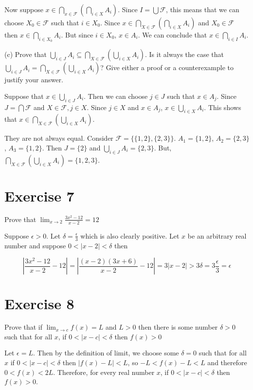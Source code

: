 \documentclass[11pt]{article}
\newcommand{\family}[1]{\mathcal{#1}}
\begin{document}
Now suppose $x \in \bigcap_{x \in \family{F}} (\bigcap_{i \in X} A_i)$.
Since $I = \bigcup \family{F}$, this means that we can choose $X_0 \in \family{F}$
such that $i \in X_0$. Since 
$x \in \bigcap_{X \in \family{F}} (\bigcap_{i \in X} A_i)$ and $X_0 \in \family{F}$
then $x \in \bigcap_{i \in X_0} A_i$. But since $i \in X_0$, $x \in A_i$. We can 
conclude that $x \in \bigcap_{i \in I} A_i$.

\noindent (c) Prove that $\bigcup_{i \in J} A_i \subseteq \bigcap_{X \in \family{F}} (\bigcup_{i \in X} A_i)$.
Is it always the case that $\bigcup_{i \in J} A_i = \bigcap_{X \in \family{F}} (\bigcup_{i \in X} A_i)$?
Give either a proof or a counterexample to justify your answer.

Suppose that $x \in \bigcup_{i \in J} A_i$. Then we can choose $j \in J$ such that 
$x \in A_j$. Since $J = \bigcap \family{F}$ and $X \in \family{F}, j \in X$.
Since $j \in X$ and $x \in A_j$, $x \in \bigcup_{i \in X} A_i$.
This shows that $x \in \bigcap_{X \in \family{F}} (\bigcup_{i \in X} A_i)$.

They are not always equal. Consider $\family{F} = \{\{1,2\},\{2,3\}\}$. 
$A_1 = \{1,2\}$, $A_2 = \{2,3\}$, $A_3 = \{1,2\}$. Then $J = \{2\}$ and 
$\bigcup_{i \in J} A_i = \{2,3\}$. But, 
$\bigcap_{X \in \family{F}} (\bigcup_{i \in X} A_i) = \{1,2,3\}$.

\section*{Exercise 7}

Prove that $\lim_{x \to 2} \frac{3x^2 - 12}{x - 2} = 12$

Suppose $\epsilon > 0$. Let $\delta = \frac{\epsilon}{3}$ which is also clearly 
positive. Let $x$ be an arbitrary real number and suppose 
$0 < | x - 2 | < \delta$ then 

$$\left| \frac{3x^2 - 12}{x - 2} - 12 \right| =
\left| \frac{(x-2)(3x+6)}{x-2} - 12 \right| = 
3 | x-2 | > 3 \delta = 3 \frac{\epsilon}{3} = \epsilon$$

\section*{Exercise 8}

Prove that if $\lim_{x \to c} f(x) = L$ and $L > 0$ then there is some number 
$\delta > 0$ such that for all $x$, if $0 < | x - c | < \delta$ then 
$f(x) > 0$

Let $\epsilon = L$. Then by the definition of limit, we choose some $\delta = 0$ 
such that for all $x$ if $0 < | x-c | < \delta$ then $|f(x) - L| < L$, so 
$-L < f(x) - L < L$ and therefore $0 < f(x) < 2L$. Therefore, for every real
number $x$, if $0 < | x - c | < \delta$ then $f(x) > 0$.
\end{document}
